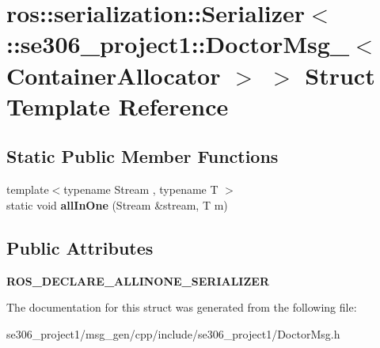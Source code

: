 \hypertarget{structros_1_1serialization_1_1Serializer_3_01_1_1se306__project1_1_1DoctorMsg___3_01ContainerAllocator_01_4_01_4}{\section{ros\-:\-:serialization\-:\-:Serializer$<$ \-:\-:se306\-\_\-project1\-:\-:Doctor\-Msg\-\_\-$<$ Container\-Allocator $>$ $>$ Struct Template Reference}
\label{structros_1_1serialization_1_1Serializer_3_01_1_1se306__project1_1_1DoctorMsg___3_01ContainerAllocator_01_4_01_4}
}
\subsection*{Static Public Member Functions}
\begin{DoxyCompactItemize}
\item 
\hypertarget{structros_1_1serialization_1_1Serializer_3_01_1_1se306__project1_1_1DoctorMsg___3_01ContainerAllocator_01_4_01_4_a71aa8b9037f829dfb99270b70becea54}{{\footnotesize template$<$typename Stream , typename T $>$ }\\static void {\bfseries all\-In\-One} (Stream \&stream, T m)}\label{structros_1_1serialization_1_1Serializer_3_01_1_1se306__project1_1_1DoctorMsg___3_01ContainerAllocator_01_4_01_4_a71aa8b9037f829dfb99270b70becea54}

\end{DoxyCompactItemize}
\subsection*{Public Attributes}
\begin{DoxyCompactItemize}
\item 
\hypertarget{structros_1_1serialization_1_1Serializer_3_01_1_1se306__project1_1_1DoctorMsg___3_01ContainerAllocator_01_4_01_4_a6ce4bfe803f9d9939193782f674e5c37}{{\bfseries R\-O\-S\-\_\-\-D\-E\-C\-L\-A\-R\-E\-\_\-\-A\-L\-L\-I\-N\-O\-N\-E\-\_\-\-S\-E\-R\-I\-A\-L\-I\-Z\-E\-R}}\label{structros_1_1serialization_1_1Serializer_3_01_1_1se306__project1_1_1DoctorMsg___3_01ContainerAllocator_01_4_01_4_a6ce4bfe803f9d9939193782f674e5c37}

\end{DoxyCompactItemize}


The documentation for this struct was generated from the following file\-:\begin{DoxyCompactItemize}
\item 
se306\-\_\-project1/msg\-\_\-gen/cpp/include/se306\-\_\-project1/Doctor\-Msg.\-h\end{DoxyCompactItemize}
